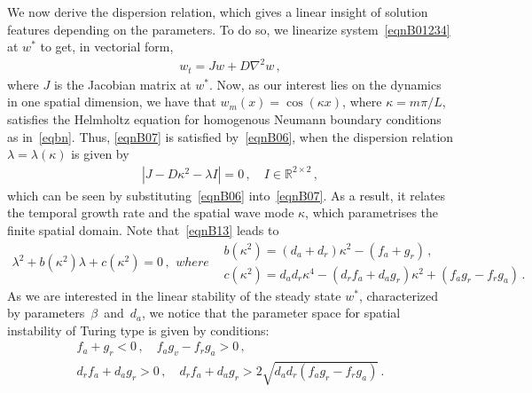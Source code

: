 \documentclass[%
 preprint,
 amsmath,amssymb,
 aps,
]{revtex4-2}
\begin{document}
We now derive the dispersion relation, which gives a linear insight of solution features depending on the parameters. To do so, we linearize system~\eqref{eqnB01234} at $w^*$ to get, in vectorial form,
	\begin{gather}\label{eqnB07}
	w_t = Jw + D \nabla^2 w	\,,
	\end{gather}
	where $J$ is the Jacobian matrix at $w^*$. Now, as our interest lies on the dynamics in one spatial dimension, we have that $w_m(x)=\cos(\kappa x)$, where $\kappa=m\pi/L$, satisfies the Helmholtz equation for homogenous Neumann boundary conditions as in~\eqref{eqbn}. Thus, \eqref{eqnB07} is satisfied by~\eqref{eqnB06}, when the dispersion relation $\lambda=\lambda(\kappa)$ is given by
	\begin{gather}\label{eqnB13}
	|J-D\kappa^2-\lambda I|=0\,, \quad I\in\mathbb{R}^{2\times2}\,,
	\end{gather}
	which can be seen by substituting~\eqref{eqnB06} into~\eqref{eqnB07}. As a result, it relates the temporal growth rate and the spatial wave mode $\kappa$, which parametrises the finite spatial domain. Note that~\eqref{eqnB13} leads to 
	\begin{subequations}\label{eq:lambda}
		\begin{gather}\label{eqnB14}
		\lambda^2 + b(\kappa^2)\lambda + c(\kappa^2) =0\,,
		\end{gather}
		where
		\begin{flalign}
		& b(\kappa^2)=(d_a+d_r)\kappa^2 -(f_a+g_r)\,, \label{eqnB15} \\
		& c(\kappa^2)=d_ad_r\kappa^4-(d_rf_a+d_ag_r)\kappa^2+ (f_ag_r-f_rg_a) \,.\label{eqnB16}
		\end{flalign}
	\end{subequations}
As we are interested in the linear stability of the steady state $w^*$, characterized by parameters~$\beta$~and~$d_a$, we notice that the parameter space for spatial instability of Turing type is given by conditions: 
\begin{subequations} \label{eqnB17}
	\begin{gather}
	f_a+g_r<0\,, \quad f_ag_v-f_rg_a>0 \,, \label{eqnB18} \\
	d_rf_a + d_ag_r > 0 \,, \quad d_rf_a + d_ag_r > 2\sqrt{d_ad_r(f_ag_r-f_rg_a)} \,. \label{eqnB20}%
	\end{gather}
\end{subequations} 
\end{document}
